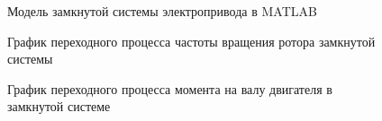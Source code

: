         \begin{figure}
            \caption{Модель замкнутой системы электропривода в MATLAB}
            \label{fig:close-loop-model}
        \end{figure}
        
        \begin{figure}[h!]
            \caption{График переходного процесса частоты вращения ротора
                замкнутой системы}
            \label{fig:close-loop-wm}
        \end{figure}

        \begin{figure}[h!]
            \caption{График переходного процесса момента на валу двигателя в
                замкнутой системе}
            \label{fig:close-loop-te}
        \end{figure}

